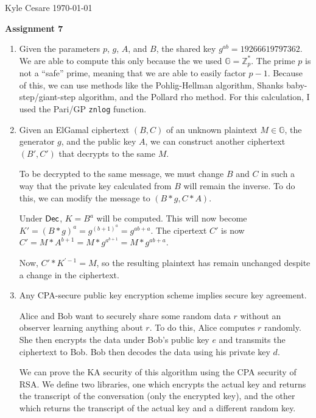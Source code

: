 \documentclass[12pt,letterpaper]{article}
\newcommand{\Z}{\mathbb{Z}}
\newcommand{\Dec}{\text{\sf Dec}}
\begin{document}
Kyle Cesare \hfill
\today \hfill

{\center\textbf{Assignment 7} \\}

\begin{enumerate}
  \item Given the parameters $p$, $g$, $A$, and $B$, the shared key $g^{ab} =
    19266619797362$. We are able to compute this only because the we used
    $\mathbb{G} = \Z_p^*$. The prime $p$ is not a ``safe'' prime, meaning that
    we are able to easily factor $p-1$. Because of this, we can use methods like
    the Pohlig-Hellman algorithm, Shanks baby-step/giant-step algorithm, and the
    Pollard rho method. For this calculation, I used the Pari/GP \texttt{znlog}
    function.

  \item Given an ElGamal ciphertext $(B, C)$ of an unknown plaintext $M \in
    \mathbb{G}$, the generator $g$, and the public key $A$, we can construct
    another ciphertext $(B', C')$ that decrypts to the same $M$.

    To be decrypted to the same message, we must change $B$ and $C$ in such a
    way that the private key calculated from $B$ will remain the inverse. To do
    this, we can modify the message to $(B * g, C * A)$.

    Under $\Dec$, $K = B^a$ will be computed. This will now become $K' = (B *
    g)^a = g^{(b+1)^a} = g^{ab + a}$. The cipertext $C'$ is now $C' = M *
    A^{b+1} = M * g^{a^{b+1}} = M * g^{ab + a}$.

    Now, $C' * K^{\prime-1} = M$, so the resulting plaintext has remain
    unchanged despite a change in the ciphertext.

  \item Any CPA-secure public key encryption scheme implies secure key
    agreement.

    Alice and Bob want to securely share some random data $r$ without an
    observer learning anything about $r$. To do this, Alice computes $r$
    randomly. She then encrypts the data under Bob's public key $e$ and
    transmits the ciphertext to Bob. Bob then decodes the data using his private
    key $d$.

    We can prove the KA security of this algorithm using the CPA security of
    RSA. We define two libraries, one which encrypts the actual key and returns
    the transcript of the conversation (only the encrypted key), and the other
    which returns the transcript of the actual key and a different random key.


\end{enumerate}
\end{document}
